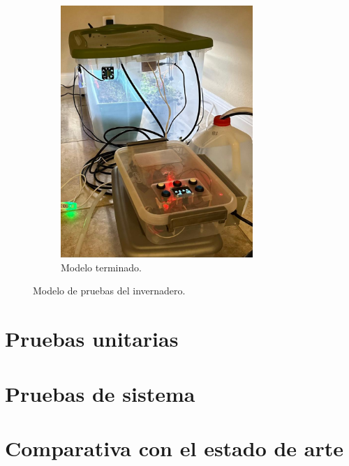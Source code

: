 \begin{figure}[!htpb]
     \hfill
     \begin{subfigure}[b]{0.45\textwidth}
	    \centering
		 \includegraphics[width=0.80\textwidth]{./Figures/chapter4/Invernadero5.jpg}
		\caption{Modelo terminado.}
		\label{fig:gh5}
     \end{subfigure}
     \hfill	

        \caption[Modelo de pruebas del invernadero]{Modelo de pruebas del invernadero.}
        \label{fig:invernadero}
\end{figure}





\section{Pruebas unitarias}
\label{sec:Pruebas unitarias}
\section{Pruebas de sistema}
\label{sec:Pruebas de sistema}
\section{Comparativa con el estado de arte}
\label{sec:Comparativa con el estado de arte}